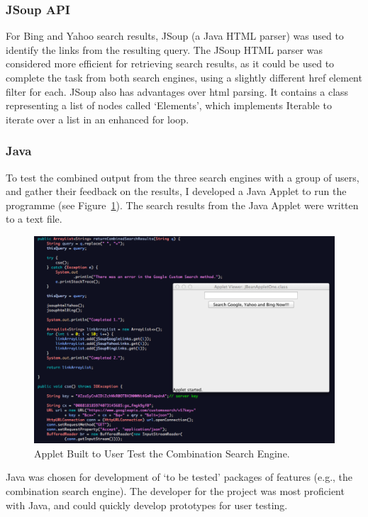 \documentclass[a4paper, 11pt]{article}
\begin{document}
\subsubsection{JSoup API}
For Bing and Yahoo search results, JSoup (a Java HTML parser) was used to identify the links from the resulting query. The JSoup HTML parser was considered more efficient for retrieving search results, as it could be used to complete the task from both search engines, using a slightly different href element filter for each. JSoup also has advantages over html parsing. It contains a class representing a list of nodes called `Elements', which implements Iterable to iterate over a list in an enhanced for loop.

\subsubsection{Java}
To test the combined output from the three search engines with a group of users, and gather their feedback on the results, I developed a Java Applet to run the programme (see Figure~\ref{applet}). The search results from the Java Applet were written to a text file.


\begin{figure}[H]
\begin{center}
\includegraphics[scale=0.40]{Applet}
\caption{Applet Built to User Test the Combination Search Engine. }
\label{applet}
\end{center}
\end{figure}

Java was chosen for development of `to be tested' packages of features (e.g., the combination search engine). The developer for the project was most proficient with Java, and could quickly develop prototypes for user testing.
\end{document}
